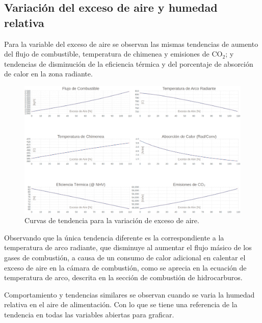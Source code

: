 \subsection{Variación del exceso de aire y humedad relativa}
\par Para la variable del exceso de aire se observan las mismas tendencias de aumento del flujo de combustible, temperatura de chimenea y emisiones de CO$_2$; y tendencias de disminución de la eficiencia térmica y del porcentaje de absorción de calor en la zona radiante.
\begin{figure}[H] \begin{center}
\includegraphics[scale=0.24]{images/exceso-aire}
\caption[Curvas de tendencia para la variación de exceso de aire]{Curvas de tendencia para la variación de exceso de aire.}
\label{fig:exceso-aire} \end{center} \end{figure}
\par Observando que la única tendencia diferente es la correspondiente a la temperatura de arco radiante, que disminuye al aumentar el flujo másico de los gases de combustión, a causa de un consumo de calor adicional en calentar el exceso de aire en la cámara de combustión, como se aprecia en la ecuación de temperatura de arco, descrita en la sección de combustión de hidrocarburos.
\par Comportamiento y tendencias similares se observan cuando se varia la humedad relativa en el aire de alimentación. Con lo que se tiene una referencia de la tendencia en todas las variables abiertas para graficar.


